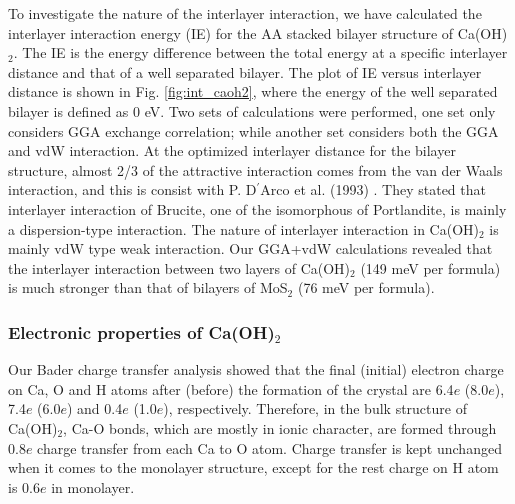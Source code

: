 To investigate the nature of the interlayer interaction, we 
have calculated the interlayer interaction energy (IE) for the AA stacked 
bilayer structure of Ca(OH)$_2$. The IE is the energy difference between the 
total energy at a specific interlayer distance and that of a well
separated bilayer. The plot of IE versus interlayer distance is shown in Fig. 
\ref{fig:int_caoh2}, where the energy of the  well separated bilayer is defined as 
0 eV. Two sets of calculations were performed, one set only considers GGA 
exchange correlation; while another set considers both the GGA and vdW 
interaction. At the optimized interlayer distance for the bilayer structure, 
almost 2/3 of the attractive interaction comes from the van der Waals 
interaction, and this is consist with P. D$^\prime$Arco et al. (1993) 
\cite{D'Arco1993} . They stated that
interlayer interaction of Brucite, one of the isomorphous of Portlandite, is
mainly a dispersion-type interaction. The nature of interlayer interaction in Ca(OH)$_2$ is mainly vdW type weak interaction. Our GGA+vdW calculations revealed that the interlayer interaction between two layers of Ca(OH)$_2$ (149 meV per formula) is much stronger than that of bilayers of MoS$_2$ (76 meV per formula).














\subsubsection{Electronic properties of C\lowercase{a}(OH)$_{2}$}\label{sec:electronic}


Our Bader charge transfer analysis showed that the final (initial) electron 
charge on Ca, O and H atoms after (before) the formation of the crystal are 
6.4$e$ (8.0$e$), 7.4$e$ (6.0$e$) and 0.4$e$ (1.0$e$), respectively. Therefore, 
in the bulk structure of Ca(OH)$_2$, Ca-O bonds, which are 
mostly in ionic character, are formed through 0.8$e$ charge transfer 
from each Ca to O atom.  Charge transfer is kept unchanged when it comes to the monolayer structure, except for the rest charge on H atom is 0.6$e$ in monolayer.



